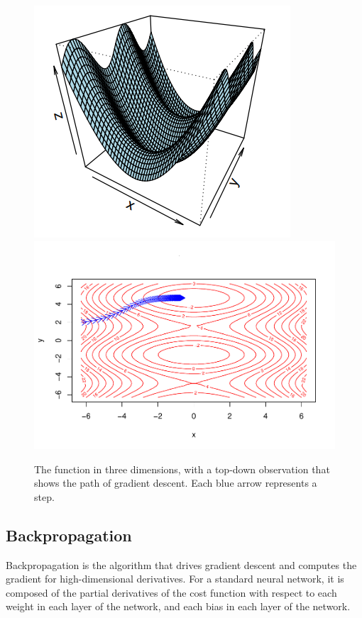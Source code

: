 \begin{figure}[H]
    \includegraphics[width = .4\textwidth]{Figures/grad_desc-51.png}
    \includegraphics[width = .6\textwidth]{Figures/grad_desc-50.pdf}
    \caption{The function in three dimensions, with a top-down observation that shows the path of gradient descent.  Each blue arrow represents a step.}
    \label{grad}
\end{figure}


\hypertarget{backpropagation}{%
\subsection{Backpropagation}\label{backpropagation}}

Backpropagation is the algorithm that drives gradient descent and computes the gradient for high-dimensional derivatives. For a standard neural network, it is composed of the partial derivatives of the cost function with respect to each weight in each layer of the network, and each bias in each layer of the network.

